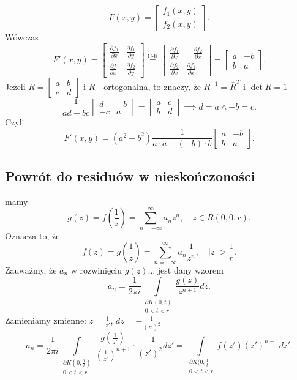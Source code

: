 \documentclass[../main.tex]{subfiles}
\begin{document}
\[
    F(x,y) = \begin{bmatrix} f_1(x,y)\\ f_2(x,y) \end{bmatrix}
.\]
Wówczas
\[
    F'(x,y) = \begin{bmatrix} \frac{\partial f_1}{\partial x} & \frac{\partial f_1}{\partial y} \\ \frac{\partial f}{\partial x} & \frac{\partial f_2}{\partial y}  \end{bmatrix} \overset{\text{C-R}}{=} \begin{bmatrix} \frac{\partial f_1}{\partial x} &-\frac{\partial f_2}{\partial x} \\\frac{\partial f_2}{\partial x} &\frac{\partial f_1}{\partial x}  \end{bmatrix} = \begin{bmatrix} a&-b\\b&a \end{bmatrix}
.\]
Jeżeli $R = \begin{bmatrix} a&b\\c&d \end{bmatrix} $ i $R$ - ortogonalna, to znaczy, że $R^{-1} = \bar{R}^{T}$ i $\det R = 1$
     \[
         \frac{1}{ad - bc}\begin{bmatrix} d&-b\\ -c&a \end{bmatrix} = \begin{bmatrix} a&c\\b&d \end{bmatrix} \implies d = a \land -b = c
    .\]
Czyli
\[
    F'(x,y) = (a^2 + b^2)\frac{1}{a\cdot a - (-b)\cdot b}\begin{bmatrix} a&-b\\b&a \end{bmatrix}
.\]
\subsection{Powrót do residuów w nieskończoności}
mamy
\[
    g(z) = f\left(\frac{1}{z}\right) = \sum_{n=-\infty}^{\infty} a_n z^n,\quad z\in R(0,0,r)
.\]
Oznacza to, że
\[
    f(z) = g\left( \frac{1}{z} \right) = \sum_{n=-\infty}^{\infty} a_n \frac{1}{z^n},\quad |z| > \frac{1}{r}
.\]
Zauważmy, że $a_n$ w rozwinięciu $g(z)\ldots$ jest dany wzorem
\[
    a_n = \frac{1}{2\pi i} \int\limits_{\substack{\partial K(0,t)\\ 0 < t < r}} \frac{g(z)}{z^{n+1}}dz
.\]
Zamieniamy zmienne: $z = \frac{1}{z'}$, $dz = -\frac{1}{(z')^2}$
 \[
     a_n = \frac{1}{2\pi i} \int\limits_{\substack{\partial K\left(0,\frac{1}{t}\right)\\ 0 < t < r}} \frac{g\left( \frac{1}{z'} \right) }{\left( \frac{1}{z'} \right) ^{n+1}}\cdot \frac{-1}{(z')^2}dz' = \int\limits_{\substack{\partial K(0,\frac{1}{t}\\ 0 < t < r}}f(z')(z')^{n-1}dz'
 .\]
\end{document}
